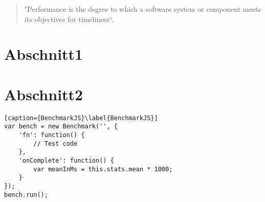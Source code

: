 \begin{quote}
"Performance is the degree to which a software system or component meets its objectives for timeliness“. 
\end{quote}

\section{Abschnitt1}
\label{abschnitt1}

\section{Abschnitt2}
\label{abschnitt2}


\begin{lstlisting}[caption={BenchmarkJS}\label{BenchmarkJS}]
var bench = new Benchmark('', {
	'fn': function() {
		// Test code
	},
	'onComplete': function() {
		var meanInMs = this.stats.mean * 1000;
	}
});
bench.run();
\end{lstlisting}
